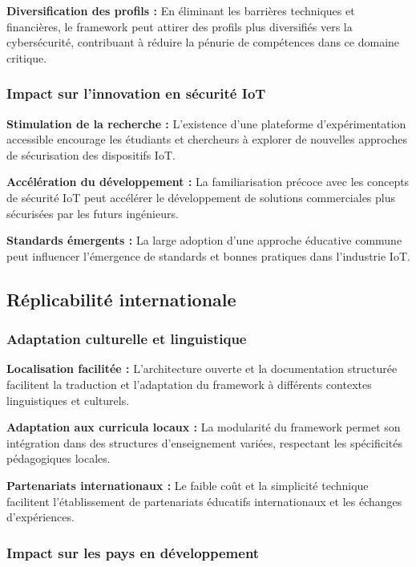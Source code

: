 \textbf{Diversification des profils :} En éliminant les barrières techniques et financières, le framework peut attirer des profils plus diversifiés vers la cybersécurité, contribuant à réduire la pénurie de compétences dans ce domaine critique.

\subsubsection{Impact sur l'innovation en sécurité IoT}

\textbf{Stimulation de la recherche :} L'existence d'une plateforme d'expérimentation accessible encourage les étudiants et chercheurs à explorer de nouvelles approches de sécurisation des dispositifs IoT.

\textbf{Accélération du développement :} La familiarisation précoce avec les concepts de sécurité IoT peut accélérer le développement de solutions commerciales plus sécurisées par les futurs ingénieurs.

\textbf{Standards émergents :} La large adoption d'une approche éducative commune peut influencer l'émergence de standards et bonnes pratiques dans l'industrie IoT.

\subsection{Réplicabilité internationale}

\subsubsection{Adaptation culturelle et linguistique}

\textbf{Localisation facilitée :} L'architecture ouverte et la documentation structurée facilitent la traduction et l'adaptation du framework à différents contextes linguistiques et culturels.

\textbf{Adaptation aux curricula locaux :} La modularité du framework permet son intégration dans des structures d'enseignement variées, respectant les spécificités pédagogiques locales.

\textbf{Partenariats internationaux :} Le faible coût et la simplicité technique facilitent l'établissement de partenariats éducatifs internationaux et les échanges d'expériences.

\subsubsection{Impact sur les pays en développement}

